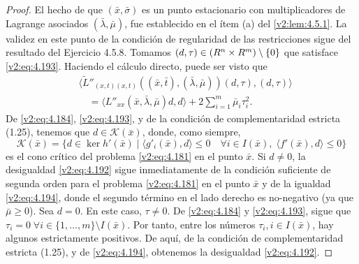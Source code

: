 \begin{proof}
    El hecho de que $(\bar{x}, \bar{\sigma})$ es un punto estacionario con multiplicadores de Lagrange asociados $(\bar{\lambda}, \bar{\mu})$, fue establecido en el ítem (a) del \cref{v2:lem:4.5.1}. La validez en este punto de la condición de regularidad de las restricciones sigue del resultado del Ejercicio 4.5.8.
    Tomamos $(d, \tau) \in (R^n \times R^m) \setminus \{0\}$ que satisface \eqref{v2:eq:4.193}. Haciendo el cálculo directo, puede ser visto que
    \begin{align}
        &\langle \tilde{L}''_{(x,t)(x,t)}((\bar{x}, \bar{t}), (\bar{\lambda}, \bar{\mu}))(d, \tau), (d, \tau) \rangle \nonumber \\
        &\quad = \langle L''_{xx}(\bar{x}, \bar{\lambda}, \bar{\mu})d, d \rangle + 2\sum_{i=1}^m \bar{\mu}_i \tau_i^2.
        \label{v2:eq:4.194}
    \end{align}
    De \eqref{v2:eq:4.184}, \eqref{v2:eq:4.193}, y de la condición de complementaridad estricta (1.25), tenemos que $d \in \mathcal{K}(\bar{x})$, donde, como siempre,
    \[
        \mathcal{K}(\bar{x}) = \{d \in \ker h'(\bar{x}) \mid \langle g'_i(\bar{x}), d \rangle \le 0 \quad \forall i \in I(\bar{x}), \; \langle f'(\bar{x}), d \rangle \le 0\}
    \]
    es el cono crítico del problema \eqref{v2:eq:4.181} en el punto $\bar{x}$. Si $d \neq 0$, la desigualdad \eqref{v2:eq:4.192} sigue inmediatamente de la condición suficiente de segunda orden para el problema \eqref{v2:eq:4.181} en el punto $\bar{x}$ y de la igualdad \eqref{v2:eq:4.194}, donde el segundo término en el lado derecho es no-negativo (ya que $\bar{\mu} \ge 0$).
    Sea $d = 0$. En este caso, $\tau \neq 0$. De \eqref{v2:eq:4.184} y \eqref{v2:eq:4.193}, sigue que $\tau_i = 0 \; \forall i \in \{1, \dots, m\} \setminus I(\bar{x})$. Por tanto, entre los números $\tau_i, i \in I(\bar{x})$, hay algunos estrictamente positivos. De aquí, de la condición de complementaridad estricta (1.25), y de \eqref{v2:eq:4.194}, obtenemos la desigualdad \eqref{v2:eq:4.192}.
\end{proof}

